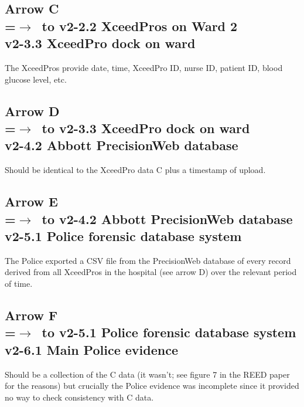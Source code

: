\subsection*{Arrow  C\\
=\hbox{$\rightarrow$~}\hbox to v2-2.2 XceedPros on Ward 2\\v2-3.3 XceedPro dock on ward}
The XceedPros provide date, time, XceedPro ID, nurse ID, patient ID, blood glucose level, etc.
\subsection*{Arrow  D\\
=\hbox{$\rightarrow$~}\hbox to v2-3.3 XceedPro dock on ward\\v2-4.2 Abbott PrecisionWeb database}
Should be identical to the XceedPro data C plus a timestamp of upload.
\subsection*{Arrow  E\\
=\hbox{$\rightarrow$~}\hbox to v2-4.2 Abbott PrecisionWeb database\\v2-5.1 Police forensic database system}
The Police exported a CSV file from the PrecisionWeb database of every record derived from all XceedPros in the hospital (see arrow D) over the relevant period of time. 
\subsection*{Arrow   F\\
=\hbox{$\rightarrow$~}\hbox to v2-5.1 Police forensic database system\\v2-6.1 Main Police evidence}
Should be a collection of the C data (it wasn't; see figure 7 in the REED paper for the reasons) but crucially the Police evidence was incomplete since it provided no way to check consistency with C data.

